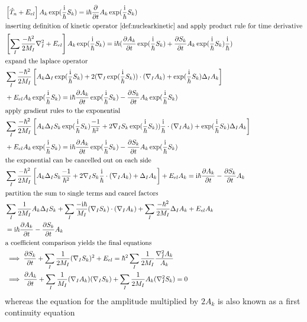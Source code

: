 \documentclass[12pt]{scrartcl}
\begin{document}
\begin{align*}
&\left[ \hat{T}_n+E_{el}\right]A_k\exp(\frac{\mathrm{i}}{\hbar}S_k)=\mathrm{i}\hbar\frac{\partial }{\partial t}A_k\exp(\frac{\mathrm{i}}{\hbar}S_k)\\
\intertext{inserting definition of kinetic operator \ref{def:nuclearkinetic} and apply product rule for time derivative}
&\left[ \sum_I\frac{-\hbar^2}{2M_I}\nabla_I^2+E_{el}\right]A_k\exp(\frac{\mathrm{i}}{\hbar}S_k)=\mathrm{i}\hbar(\frac{\partial A_k}{\partial t}\exp(\frac{\mathrm{i}}{\hbar}S_k)+\frac{\partial S_k}{\partial t}A_k\exp(\frac{\mathrm{i}}{\hbar}S_k)\frac{\mathrm{i}}{\hbar})\\
\intertext{expand the laplace operator}
&\sum_I\frac{-\hbar^2}{2M_I}\left[ A_k\Delta_I\exp(\frac{\mathrm{i}}{\hbar}S_k)+2(\nabla_I\exp(\frac{\mathrm{i}}{\hbar}S_k))\cdot(\nabla_IA_k)+\exp(\frac{\mathrm{i}}{\hbar}S_k)\Delta_IA_k\right]\\
&+E_{el}A_k\exp(\frac{\mathrm{i}}{\hbar}S_k)=\mathrm{i}\hbar\frac{\partial A_k}{\partial t}\exp(\frac{\mathrm{i}}{\hbar}S_k)-\frac{\partial S_k}{\partial t}A_k\exp(\frac{\mathrm{i}}{\hbar}S_k)\\
\intertext{apply gradient rules to the exponential}
&\sum_I\frac{-\hbar^2}{2M_I}\left[ A_k\Delta_IS_k\exp(\frac{\mathrm{i}}{\hbar}S_k)\frac{-1}{\hbar^2}+2\nabla_IS_k\exp(\frac{\mathrm{i}}{\hbar}S_k))\frac{\mathrm{i}}{\hbar}\cdot(\nabla_IA_k)+\exp(\frac{\mathrm{i}}{\hbar}S_k)\Delta_IA_k\right]\\
&+E_{el}A_k\exp(\frac{\mathrm{i}}{\hbar}S_k)=\mathrm{i}\hbar\frac{\partial A_k}{\partial t}\exp(\frac{\mathrm{i}}{\hbar}S_k)-\frac{\partial S_k}{\partial t}A_k\exp(\frac{\mathrm{i}}{\hbar}S_k)\\
\intertext{the exponential can be cancelled out on each side}
&\sum_I\frac{-\hbar^2}{2M_I}\left[ A_k\Delta_IS_k\frac{-1}{\hbar^2}+2\nabla_IS_k\frac{\mathrm{i}}{\hbar}\cdot(\nabla_IA_k)+\Delta_IA_k\right]+E_{el}A_k=\mathrm{i}\hbar\frac{\partial A_k}{\partial t}-\frac{\partial S_k}{\partial t}A_k\\
\intertext{partition the sum to single terms and cancel factors}
&\sum_I\frac{1}{2M_I}A_k\Delta_IS_k+\sum_I\frac{-\mathrm{i}\hbar}{M_I}(\nabla_IS_k)\cdot(\nabla_IA_k)+\sum_I\frac{-\hbar^2}{2M_I}\Delta_IA_k+E_{el}A_k\\
&=\mathrm{i}\hbar\frac{\partial A_k}{\partial t}-\frac{\partial S_k}{\partial t}A_k\\
\intertext{a coefficient comparison yields the final equations}
&\implies\frac{\partial S_k}{\partial t} + \sum_I\frac{1}{2M_I}(\nabla_IS_k)^2+E_{el}=\hbar^2\sum_I\frac{1}{2M_I}\frac{\nabla_I^2A_k}{A_k} \\
&\implies\frac{\partial A_k}{\partial t}+\sum_I\frac{1}{M_I}(\nabla_IA_k)(\nabla_IS_k)+\sum_I\frac{1}{2M_I}A_k(\nabla_I^2S_k)=0
\end{align*}
whereas the equation for the amplitude multiplied by $2A_k$ is also known as a first continuity equation
\end{document}
